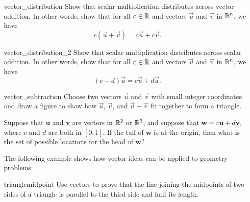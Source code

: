 \documentclass{watsonbook}
\begin{document}
\begin{exercise}{}{vector_distribution}
  Show that scalar multiplication distributes across vector
  addition. In other words, show that for all $c\in \mathbb{R}$ and vectors
  $\vec{u}$ and $\vec{v}$ in $\mathbb{R}^n$, we have 
  \[
    c(\vec{u} + \vec{v})= c
    \vec{u} + c \vec{v}. 
  \] 
\end{exercise}

\begin{exercise}{}{vector_distribution_2}
  Show that scalar multiplication distributes across scalar 
  addition. In other words, show that for all $c\in \mathbb{R}$ and vectors
  $\vec{u}$ and $\vec{v}$ in $\mathbb{R}^n$, we have 
  \[
    (c+d)\vec{u}  = c \vec{u} + d \vec{u}. 
  \] 
\end{exercise}

\begin{exercise}{}{vector_subtraction}
  Choose two vectors $\vec{u}$ and $\vec{v}$ with small integer
  coordinates and draw a figure to show how $\vec{u}$, $\vec{v}$, and $\vec{u}
  - \vec{v}$
  fit together to form a triangle. 
\end{exercise}

\begin{exercise}{}{}
  Suppose that $\mathbf{u}$ and $\mathbf{v}$ are vectors in $\mathbb{R}^2$ or
  $\mathbb{R}^3$, and suppose that $\mathbf{w} = c \mathbf{u} + d \mathbf{v}$,
  where $c$ and $d$ are both in $[0,1]$. If the tail of $\mathbf{w}$
  is at the origin, then what is the set of possible locations for the
  head of $\mathbf{w}$?
\end{exercise}

The following example shows how vector ideas can be applied to geometry
problems. 

\begin{example}{}{trianglemidpoint}
  Use vectors to prove that the line joining the midpoints of two
  sides of a triangle is parallel to the third side and half its
  length.
\end{example}
\end{document}
